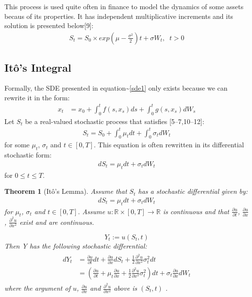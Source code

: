 \documentclass[12pt,twoside]{reedthesis}
\newtheorem{theorem}{Theorem}[section]
\theoremstyle{definition}
\theoremstyle{definition}
\theoremstyle{remark}
\begin{document}
  This process is used quite often in finance to model the dynamics of
  some assets becaus of its properties. It has independent multiplicative
  increments and its solution is presented below{[}9{]}:
  \begin{align}
  S_t = S_0 \times exp{\left(\mu - \frac{\sigma^2}{2} \right) t + \sigma W_t}, \;\; t > 0
  \end{align}
  \subsection{Itô's Integral}\label{itos-integral}
  
  Formally, the SDE presented in equation\textasciitilde{}\ref{sde1} only
  exists because we can rewrite it in the form:
  \begin{align} \label{sde1}
  x_t &= x_0 + \int_{0}^{t}{f(s, x_s)ds} + \int_{0}^{t}{g(s, x_s)dW_s}
  \end{align}
  Let \(S_{t}\) be a real-valued stochastic process that satisfies
  {[}5--7,10--12{]}:
  \begin{align}
  S_t = S_0 + \int_{0}^{t} \mu_t dt + \int_{0}^{t} \sigma_t dW_t
  \end{align}
  \noindent
  for some \(\mu_t\), \(\sigma_t\) and \(t \in [0,T]\). This equation is
  often rewritten in its differential stochastic form:
  \begin{align}
  dS_t = \mu_t dt + \sigma_t dW_t 
  \end{align}
  \noindent
  for \(0 \leq t \leq T\).
  \begin{theorem}[Itô's Lemma]
  Assume that $S_t$ has a stochastic differential given by:
  \begin{align}
  dS_t = \mu_t dt + \sigma_t dW_t 
  \end{align}
  \noindent
  for $\mu_t$, $\sigma_t$ and $t \in [0,T]$. Assume $u: \mathbb{R} \times [0, T] \rightarrow \mathbb{R}$ is continuous and that $\frac{\partial u}{\partial t}$, $\frac{\partial u}{\partial x}$, $\frac{\partial^2 u}{\partial x^2}$ exist and are continuous.
  
  $$Y_t := u(S_t, t)$$
  \noindent
  Then Y has the following stochastic differential:
  \begin{align} 
  \label{eq:ito}
  \begin{split}
      dY_t &= \frac{\partial u}{\partial t}dt + \frac{\partial u}{\partial x} dS_t + \frac{1}{2}\frac{\partial^2 u}{\partial x^2}\sigma_t^2 dt  \\[10pt] 
      &= \left( \frac{\partial u}{\partial t} + \mu_t \frac{\partial u}{\partial x} + \frac{1}{2}\frac{\partial^2 u}{\partial x^2}\sigma_t^2 \right) dt + \sigma_t \frac{\partial u}{\partial x} dW_t
  \end{split}
  \end{align}
  \noindent 
  where the argument of $u$, $\frac{\partial u}{\partial x}$ and $\frac{\partial^2 u}{\partial x^2}$ above is $\left( S_t, t \right)$ .
  \end{theorem}
\end{document}
